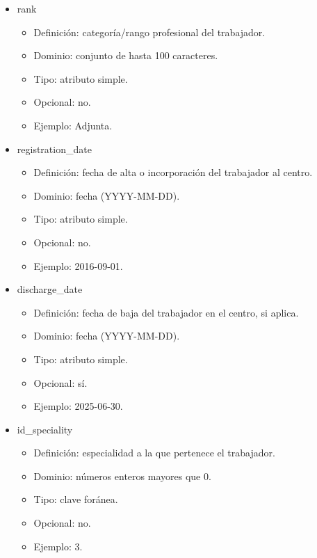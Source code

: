 \begin{itemize}
\begin{itemize}
        \item rank
        \begin{itemize}
            \item Definición: categoría/rango profesional del trabajador.
            \item Dominio: conjunto de hasta 100 caracteres.
            \item Tipo: atributo simple.
            \item Opcional: no.
            \item Ejemplo: Adjunta.
        \end{itemize}

        \item registration\_date
        \begin{itemize}
            \item Definición: fecha de alta o incorporación del trabajador al centro.
            \item Dominio: fecha (YYYY-MM-DD).
            \item Tipo: atributo simple.
            \item Opcional: no.
            \item Ejemplo: 2016-09-01.
        \end{itemize}

        \item discharge\_date
        \begin{itemize}
            \item Definición: fecha de baja del trabajador en el centro, si aplica.
            \item Dominio: fecha (YYYY-MM-DD).
            \item Tipo: atributo simple.
            \item Opcional: sí.
            \item Ejemplo: 2025-06-30.
        \end{itemize}

        \item id\_speciality
        \begin{itemize}
            \item Definición: especialidad a la que pertenece el trabajador.
            \item Dominio: números enteros mayores que 0.
            \item Tipo: clave foránea.
            \item Opcional: no.
            \item Ejemplo: 3.
        \end{itemize}
    \end{itemize}


\end{itemize}
